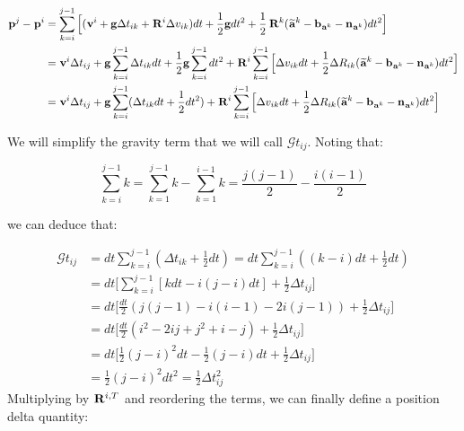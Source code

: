 \documentclass[11pt]{article}
\newcommand{\Rot}[2]{\prescript{#1}{}{\bfR}_{#2}}
\newcommand{\noise}{\bfn}
\newcommand{\bias}{\bfb}
\newcommand{\posi}[2]{\prescript{#1}{}{\bfp}_{#2}}
\newcommand{\vel}[2]{\prescript{#1}{}{\bfv}_{#2}}
\newcommand{\acc}[2]{\prescript{#1}{}{\bfa}_{#2}}
\newcommand{\accm}[2]{\prescript{#1}{}{\widetilde{\bfa}}_{#2}}
\newcommand{\grav}{\bfg}
\begin{document}
\begin{equation}
\begin{split}
\posi{}{}^{j} - \posi{}{}^{i} &= \sum_{k=i}^{j-1} \Big[
(\vel{}{}^i + \grav \Delta t_{ik} + \Rot{}{}^i \Delta v_{ik})dt 
+ \frac{1}{2}\grav dt^2 + \frac{1}{2}\Rot{}{}^{k}(\accm{}{}^k - \bias_{\acc{}{}^k} - \noise_{\acc{}{}^k})dt^2 \Big]
\\
&= \vel{}{}^i \Delta t_{ij} + 
\grav\sum_{k=i}^{j-1} \Delta t_{ik} dt + \frac{1}{2}\grav \sum_{k=i}^{j-1} dt^2 +
\Rot{}{}^i\sum_{k=i}^{j-1} \Big[\Delta v_{ik}dt +  \frac{1}{2} \Delta R_{ik} (\accm{}{}^k - \bias_{\acc{}{}^k} - \noise_{\acc{}{}^k})dt^2 \Big]
\\
&= \vel{}{}^i \Delta t_{ij} + 
\grav \sum_{k=i}^{j-1} (\Delta t_{ik} dt + \frac{1}{2}dt^2) +
\Rot{}{}^i\sum_{k=i}^{j-1} \Big[\Delta v_{ik}dt +  \frac{1}{2} \Delta R_{ik} (\accm{}{}^k - \bias_{\acc{}{}^k} - \noise_{\acc{}{}^k})dt^2 \Big]
\end{split}
\end{equation}

We will simplify the gravity term that we will call $\mathcal{G}t_{ij}$. Noting that:

\begin{equation*}
    \sum_{k=i}^{j-1}k = \sum_{k=1}^{j-1}k - \sum_{k=1}^{i-1}k = \frac{j(j-1)}{2} - \frac{i(i-1)}{2} 
\end{equation*}

we can deduce that:

\begin{equation*}
\begin{split}
\mathcal{G}t_{ij} 
&= dt \sum_{k=i}^{j-1}(\Delta t_{ik} + \frac{1}{2}dt) = dt \sum_{k=i}^{j-1}((k -i)dt + \frac{1}{2}dt)
\\
&= dt \Big[ \sum_{k=i}^{j-1} [ k dt - i(j-i)dt ] + \frac{1}{2}\Delta t_{ij}  \Big] 
\\
&= dt \Big[ \frac{dt}{2} (j(j-1) - i(i-1) - 2i(j-1)) + \frac{1}{2}\Delta t_{ij} \Big] 
\\
&= dt \Big[ \frac{dt}{2} (i^2 - 2ij + j^2 + i - j) + \frac{1}{2}\Delta t_{ij} \Big] 
\\
&= dt \Big[ \frac{1}{2} (j-i)^2dt - \frac{1}{2}(j - i)dt + \frac{1}{2}\Delta t_{ij} \Big]
\\
&= \frac{1}{2} (j-i)^2dt^2 = \frac{1}{2} \Delta t_{ij}^2
\end{split}
\end{equation*}
Multiplying by $\Rot{}{}^{i,T}$ and reordering the terms, we can finally define a position delta quantity:
\end{document}
